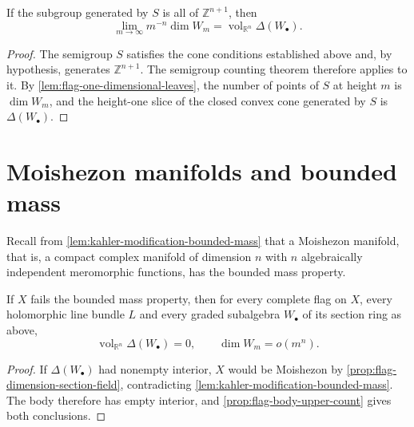 \begin{corollary}\label{cor:flag-body-primitive-count}
If the subgroup generated by $S$ is all of $\mathbb Z^{n+1}$, then
\[
 \lim_{m\to\infty}m^{-n}\dim W_m
 =\operatorname{vol}_{\mathbb R^n}\Delta(W_\bullet).
\]
\end{corollary}
\begin{proof}
The semigroup $S$ satisfies the cone conditions established above and, by hypothesis, generates $\mathbb Z^{n+1}$. The semigroup counting theorem therefore applies to it. By \cref{lem:flag-one-dimensional-leaves}, the number of points of $S$ at height $m$ is $\dim W_m$, and the height-one slice of the closed convex cone generated by $S$ is $\Delta(W_\bullet)$.
\end{proof}



\section{Moishezon manifolds and bounded mass}

Recall from \cref{lem:kahler-modification-bounded-mass} that a Moishezon manifold, that is, a compact complex manifold of dimension $n$ with $n$ algebraically independent meromorphic functions, has the bounded mass property.

\begin{theorem}\label{thm:bmp-failure-flag-degeneracy}
If $X$ fails the bounded mass property, then for every complete flag on $X$, every holomorphic line bundle $L$ and every graded subalgebra $W_\bullet$ of its section ring as above,
\[
 \operatorname{vol}_{\mathbb R^n}\Delta(W_\bullet)=0,
 \qquad \dim W_m=o(m^n).
\]
\end{theorem}
\begin{proof}
If $\Delta(W_\bullet)$ had nonempty interior, $X$ would be Moishezon by \cref{prop:flag-dimension-section-field}, contradicting \cref{lem:kahler-modification-bounded-mass}. The body therefore has empty interior, and \cref{prop:flag-body-upper-count} gives both conclusions.
\end{proof}







